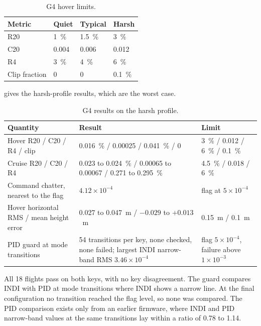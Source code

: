 \begin{table}[tbp]
\caption{G4 hover limits.}\label{tab:val_g4_lim}
\centering
\small
\begin{tabularx}{\textwidth}{@{}l l l l@{}}
\toprule
Metric & Quiet & Typical & Harsh \\
\midrule
R20 & 1~\% & 1.5~\% & 3~\% \\
C20 & 0.004 & 0.006 & 0.012 \\
R4 & 3~\% & 4~\% & 6~\% \\
Clip fraction & 0 & 0 & 0.1~\% \\
\bottomrule
\end{tabularx}
\end{table}

 gives the harsh-profile results, which are the worst case.

\begin{table}[tbp]
\caption{G4 results on the harsh profile.}\label{tab:val_g4}
\centering
\small
\begin{tabularx}{\textwidth}{@{}L{4.6cm} L{3.6cm} Y@{}}
\toprule
Quantity & Result & Limit \\
\midrule
Hover R20 / C20 / R4 / clip & 0.016~\% / 0.00025 / 0.041~\% / 0 & 3~\% / 0.012 / 6~\% / 0.1~\% \\
Cruise R20 / C20 / R4 & 0.023 to 0.024~\% / 0.00065 to 0.00067 / 0.271 to 0.295~\% & 4.5~\% / 0.018 / 6~\% \\
Command chatter, nearest to the flag & $4.12\times 10^{-4}$ & flag at $5\times 10^{-4}$ \\
Hover horizontal RMS / mean height error & 0.027 to 0.047~m / $-0.029$ to $+0.013$~m & 0.15~m / 0.1~m \\
PID guard at mode transitions & 54 transitions per key, none checked, none failed; largest INDI narrow-band RMS $3.46\times 10^{-4}$ & flag $5\times 10^{-4}$, failure above $1\times 10^{-3}$ \\
\bottomrule
\end{tabularx}
\end{table}

All 18 flights pass on both keys, with no key disagreement.
The guard compares INDI with PID at mode transitions where INDI shows a narrow line.
At the final configuration no transition reached the flag level, so none was compared.
The PID comparison exists only from an earlier firmware, where INDI and PID narrow-band values at the same transitions lay within a ratio of 0.78 to 1.14.


